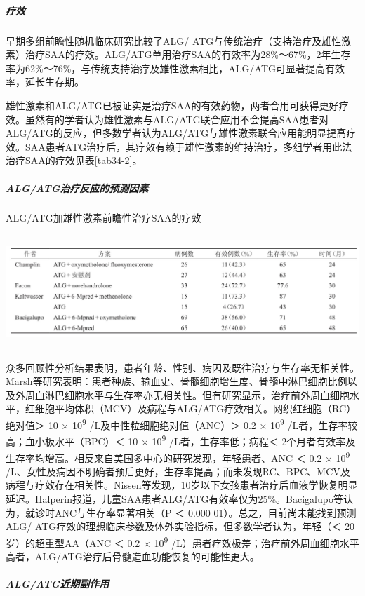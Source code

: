 \subparagraph{疗效}

早期多组前瞻性随机临床研究比较了ALG/
ATG与传统治疗（支持治疗及雄性激素）治疗SAA的疗效。ALG/ATG单用治疗SAA的有效率为28\%～67\%，2年生存率为62\%～76\%，与传统支持治疗及雄性激素相比，ALG/ATG可显著提高有效率，延长生存期。

雄性激素和ALG/ATG已被证实是治疗SAA的有效药物，两者合用可获得更好疗效。虽然有的学者认为雄性激素与ALG/ATG联合应用不会提高SAA患者对ALG/ATG的反应，但多数学者认为ALG/ATG与雄性激素联合应用能明显提高疗效。SAA患者ATG治疗后，其疗效有赖于雄性激素的维持治疗，多组学者用此法治疗SAA的疗效见表\ref{tab34-2}。

\subparagraph{ALG/ATG治疗反应的预测因素}

\begin{table}[htbp]
\centering
\caption{ALG/ATG加雄性激素前瞻性治疗SAA的疗效}
\label{tab34-2}
\includegraphics[width=6.60417in,height=1.67708in]{./images/Image00127.jpg}
\end{table}

众多回顾性分析结果表明，患者年龄、性别、病因及既往治疗与生存率无相关性。Marsh等研究表明：患者种族、输血史、骨髓细胞增生度、骨髓中淋巴细胞比例以及外周血淋巴细胞水平与生存率亦无相关性。但有研究显示，治疗前外周血细胞水平，红细胞平均体积（MCV）及病程与ALG/ATG疗效相关。网织红细胞（RC）绝对值＞
10 × 10\textsuperscript{9} /L及中性粒细胞绝对值（ANC）＞ 0.2 ×
10\textsuperscript{9} /L者，生存率较高；血小板水平（BPC）＜ 10 ×
10\textsuperscript{9} /L者，生存率低；病程＜
2个月者有效率及生存率均增高。相反来自美国多中心的研究发现，年轻患者、ANC
＜ 0.2 × 10\textsuperscript{9}
/L、女性及病因不明确者预后更好，生存率提高；而未发现RC、BPC、MCV及病程与疗效存在相关性。Nissen等发现，10岁以下女孩患者治疗后血液学恢复明显延迟。Halperin报道，儿童SAA患者ALG/ATG有效率仅为25\%。Bacigalupo等认为，就诊时ANC与生存率显著相关（P
＜ 0.000 01）。总之，目前尚未能找到预测ALG/
ATG疗效的理想临床参数及体外实验指标，但多数学者认为，年轻（＜
20岁）的超重型AA（ANC ＜ 0.2 × 10\textsuperscript{9}
/L）患者疗效极差；治疗前外周血细胞水平高者，ALG/ATG治疗后骨髓造血功能恢复的可能性更大。

\subparagraph{ALG/ATG近期副作用}

